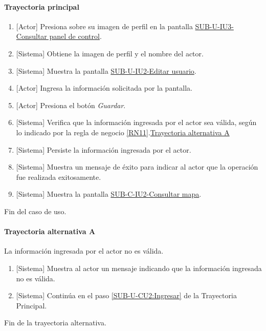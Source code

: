 \paragraph{Trayectoria principal}
	\begin{enumerate}
		\item {[Actor]} Presiona sobre su imagen de perfil en la pantalla \hyperref[fig:sub-u-iu3]{SUB-U-IU3-Consultar panel de control}.
		\item {[Sistema]} Obtiene la imagen de perfil y el nombre del actor.
		\item {[Sistema]} Muestra la pantalla \hyperref[fig:sub-u-iu2]{SUB-U-IU2-Editar usuario}.
		\item \label{SUB-U-CU2:Ingresar} {[Actor]} Ingresa la información solicitada por la pantalla.
		\item {[Actor]} Presiona el botón \textit{Guardar}.
		\item {[Sistema]} Verifica que la información ingresada por el actor sea válida, según lo indicado por la regla de negocio \ref{RN11}.\hyperref[SUB-U-CU2:TA]{Trayectoria alternativa A}
		\item {[Sistema]} Persiste la información ingresada por el actor.
		\item {[Sistema]} Muestra un mensaje de éxito para indicar al actor que la operación fue realizada exitosamente.
		\item \label{SUB-U-CU2:Pantalla} {[Sistema]} Muestra la pantalla \hyperref[fig:sub-c-iu2]{SUB-C-IU2-Consultar mapa}.
	\end{enumerate}
	Fin del caso de uso.

\paragraph{Trayectoria alternativa A} \label{SUB-U-CU2:TA}
	La información ingresada por el actor no es válida.
	\begin{enumerate}[label=A\arabic*.]
		\item {[Sistema]} Muestra al actor un mensaje indicando que la información ingresada no es válida.
		\item {[Sistema]} Continúa en el paso \ref{SUB-U-CU2:Ingresar} de la Trayectoria Principal.
	\end{enumerate}
	Fin de la trayectoria alternativa.

